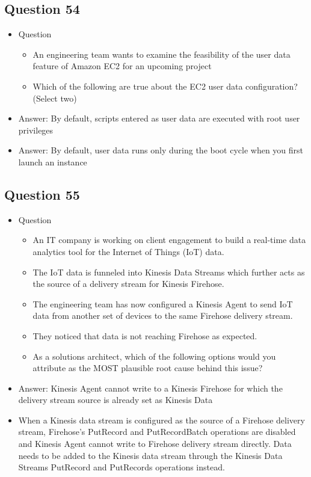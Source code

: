 \documentclass[]{scrartcl}
\begin{document}
\subsection{Question 54}
\begin{itemize}
	\item Question
	\begin{itemize}
		\item An engineering team wants to examine the feasibility of the user data feature of Amazon EC2 for an upcoming project
		\item Which of the following are true about the EC2 user data configuration? (Select two)
	\end{itemize}
	\item Answer: By default, scripts entered as user data are executed with root user privileges
	\item Answer: By default, user data runs only during the boot cycle when you first launch an instance
\end{itemize}

\subsection{Question 55}
\begin{itemize}
	\item Question
	\begin{itemize}
		\item An IT company is working on client engagement to build a real-time data analytics tool for the Internet of Things (IoT) data. 
		\item The IoT data is funneled into Kinesis Data Streams which further acts as the source of a delivery stream for Kinesis Firehose. 
		\item The engineering team has now configured a Kinesis Agent to send IoT data from another set of devices to the same Firehose delivery stream. 
		\item They noticed that data is not reaching Firehose as expected.
		\item As a solutions architect, which of the following options would you attribute as the MOST plausible root cause behind this issue?
	\end{itemize}
	\item Answer: Kinesis Agent cannot write to a Kinesis Firehose for which the delivery stream source is already set as Kinesis Data
	\item When a Kinesis data stream is configured as the source of a Firehose delivery stream, Firehose’s PutRecord and PutRecordBatch operations are disabled and Kinesis Agent cannot write to Firehose delivery stream directly. Data needs to be added to the Kinesis data stream through the Kinesis Data Streams PutRecord and PutRecords operations instead.
\end{itemize}
\end{document}
